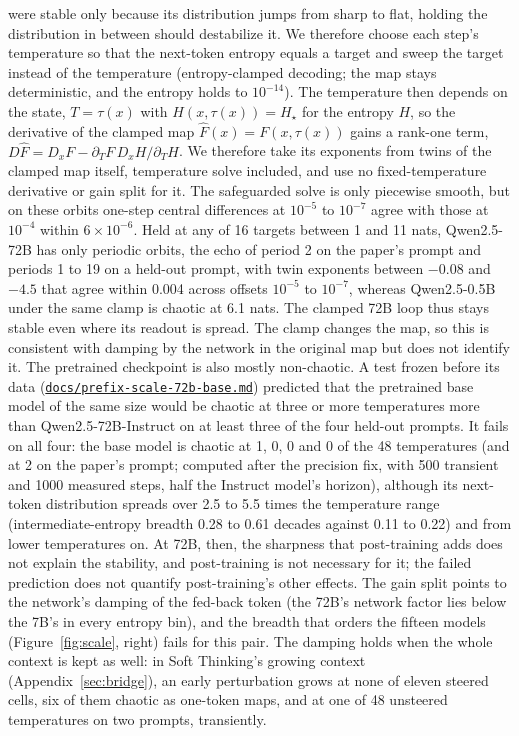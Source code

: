 \documentclass[11pt,letterpaper]{article}
\newcommand{\repourl}{https://github.com/tdj28/neural-shrimp}
\newcommand{\reporef}{arxiv-v1}
\newcommand{\repo}[1]{\href{\repourl/blob/\reporef/#1}{\nolinkurl{#1}}}
\begin{document}
were stable only because its distribution jumps from sharp to flat, holding the distribution in between should
destabilize it. We therefore choose each step's
temperature so that the next-token entropy equals a target and sweep the target instead of the temperature
(entropy-clamped decoding; the map stays deterministic, and the entropy holds to $10^{-14}$). The temperature then
depends on the state, $T=\tau(x)$ with $H(x,\tau(x))=H_\star$ for the entropy $H$, so the derivative of the clamped
map $\hat F(x)=F(x,\tau(x))$ gains a rank-one term, $D\hat F=D_xF-\partial_TF\,D_xH/\partial_TH$. We therefore take
its exponents from twins of the clamped map itself, temperature solve included, and use no fixed-temperature
derivative or gain split for it. The safeguarded solve is only piecewise smooth, but on these orbits one-step central
differences at $10^{-5}$ to $10^{-7}$ agree with those at $10^{-4}$ within $6\times10^{-6}$. Held at any of 16 targets
between 1 and 11 nats, Qwen2.5-72B has only periodic orbits, the echo of period 2 on the paper's prompt and periods 1
to 19 on a held-out prompt, with twin exponents between $-0.08$ and $-4.5$ that agree within 0.004 across offsets
$10^{-5}$ to $10^{-7}$, whereas Qwen2.5-0.5B under the same clamp is chaotic at 6.1 nats. The clamped 72B loop thus
stays stable even where its readout is spread. The clamp changes the map, so this is consistent with damping by the
network in the original map but does not identify it. The pretrained checkpoint is also mostly non-chaotic. A test
frozen before
its data (\repo{docs/prefix-scale-72b-base.md}) predicted that the pretrained base model of the same size would be
chaotic at three or more temperatures more than Qwen2.5-72B-Instruct on at least three of the four held-out prompts.
It fails on all four: the base model is chaotic at 1, 0, 0 and 0 of the 48 temperatures (and at 2 on the paper's
prompt; computed after the precision fix, with 500 transient and 1000 measured steps, half the Instruct model's
horizon), although its next-token distribution spreads over 2.5 to 5.5 times the temperature range (intermediate-entropy
breadth 0.28 to 0.61 decades against 0.11 to 0.22) and from lower temperatures on. At 72B, then, the sharpness that
post-training adds does not explain the stability, and post-training is not necessary for it; the failed prediction
does not quantify post-training's other effects. The gain split points to the network's damping of the fed-back token
(the 72B's network factor lies below the 7B's in every entropy bin), and the breadth that orders the fifteen models (Figure~\ref{fig:scale}, right) fails for this pair. The damping holds when the whole
context is kept as well: in Soft Thinking's growing context (Appendix~\ref{sec:bridge}), an early perturbation grows at
none of eleven steered cells, six of them chaotic as one-token maps, and at one of 48 unsteered temperatures on two
prompts, transiently.
\end{document}
